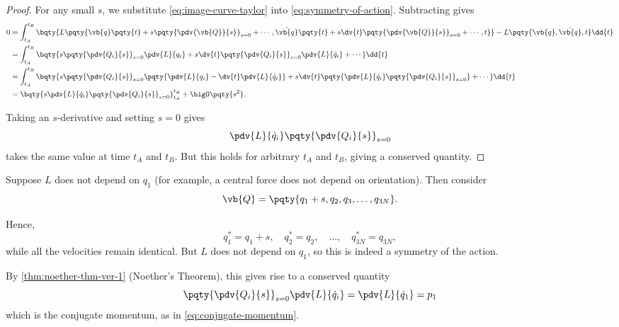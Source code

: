 \begin{proof}
    For any small \(s\), we substitute \eqref{eq:image-curve-taylor} into \eqref{eq:symmetry-of-action}. Subtracting gives
    \begin{align*}
        0 &= \int_{t_A}^{t_B} \bqty{L \pqty{\vb{q} \pqty{t} + s \pqty{\pdv{\vb{Q}}{s}}_{s = 0} + \cdots, \dot{\vb{q}} \pqty{t} + s \dv{t} \pqty{\pdv{\vb{Q}}{s}}_{s = 0} + \cdots, t}} - L \pqty{\vb{q}, \dot{\vb{q}}, t} \dd{t} \\
        &= \int_{t_A}^{t_B} \bqty{s \pqty{\pdv{Q_i}{s}}_{s = 0} \pdv{L}{q_i} + s \dv{t} \pqty{\pdv{Q_i}{s}}_{s = 0} \pdv{L}{\dot{q}_i} + \cdots} \dd{t} \\
        &= \int_{t_A}^{t_B} \bqty{s \pqty{\pdv{Q_i}{s}}_{s = 0} \pqty{\pdv{L}{q_i} - \dv{t} \pdv{L}{\dot{q}_i}} + s \dv{t} \pqty{\pdv{L}{\dot{q}_i} \pqty{\pdv{Q_i}{s}}_{s = 0}} + \cdots} \dd{t} \\
        &= \bqty{s \pdv{L}{\dot{q}_i} \pqty{\pdv{Q_i}{s}}_{s = 0}}_{t_A}^{t_B} + \bigO\pqty{s^2}.
    \end{align*}

    Taking an \(s\)-derivative and setting \(s = 0\) gives
    \[
        \pdv{L}{\dot{q}_i} \pqty{\pdv{Q_i}{s}}_{s = 0}
    \]
    takes the same value at time \(t_A\) and \(t_B\). But this holds for arbitrary \(t_A\) and \(t_B\), giving a conserved quantity.
\end{proof}

\begin{example}
    Suppose \(L\) does not depend on \(q_1\) (for example, a central force does not depend on orientation). Then consider
    \[
        \vb{Q} = \pqty{q_1 + s, q_2, q_3, \ldots, q_{3N}}.
    \]

    Hence,
    \[
        q^{\ast}_1 = q_1 + s, \quad q^{\ast}_2 = q_2, \quad \ldots, \quad q^{\ast}_{3N} = q_{3N},
    \]
    while all the velocities remain identical. But \(L\) does not depend on \(q_1\), so this is indeed a symmetry of the action.

    By \autoref{thm:noether-thm-ver-1} (Noether's Theorem), this gives rise to a conserved quantity
    \[
        \pqty{\pdv{Q_i}{s}}_{s = 0} \pdv{L}{\dot{q}_i} = \pdv{L}{\dot{q}_1} = p_1
    \]
    which is the conjugate momentum, as in \eqref{eq:conjugate-momentum}.
\end{example}

